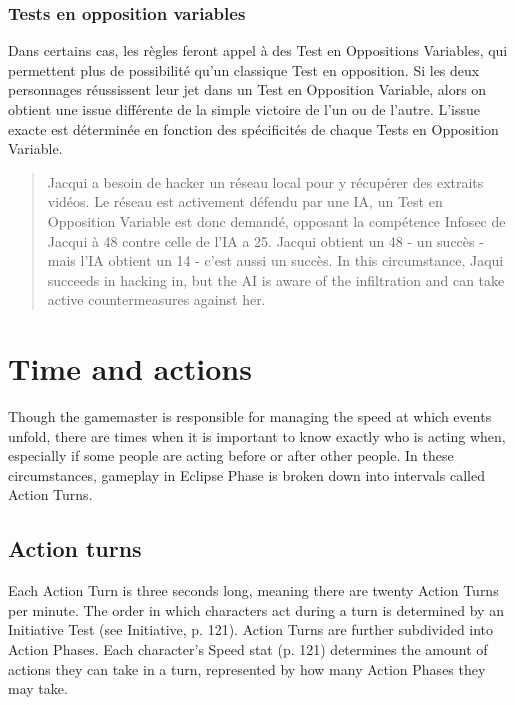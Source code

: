 \subsubsection{Tests en opposition variables} \label{sec:vari-oppos-test} 

Dans certains cas, les règles feront appel à des Test en Oppositions Variables, qui permettent plus de possibilité qu'un classique Test en opposition. Si les deux personnages réussissent leur jet dans un Test en Opposition Variable, alors on obtient une issue différente de la simple victoire de l'un ou de l'autre. L'issue exacte est déterminée en fonction des spécificités de chaque Tests en Opposition Variable. 

\begin{quotation} Jacqui a besoin de hacker un réseau local pour y récupérer des extraits vidéos. Le réseau est activement défendu par une IA, un Test en Opposition Variable est donc demandé, opposant la compétence Infosec de Jacqui à 48 contre celle de l'IA a 25. Jacqui obtient un 48 - un succès - mais l'IA obtient un 14 - c'est aussi un succès. In this circumstance, Jaqui succeeds in hacking in, but the AI is aware of the infiltration and can take active countermeasures against her. \end{quotation} 

\section{Time and actions} \label{sec:time-actions} 

Though the gamemaster is responsible for managing the speed at which events unfold, there are times when it is important to know exactly who is acting when, especially if some people are acting before or after other people. In these circumstances, gameplay in Eclipse Phase is broken down into intervals called Action Turns. 

\subsection{Action turns} \label{sec:action-turns} 

Each Action Turn is three seconds long, meaning there are twenty Action Turns per minute. The order in which characters act during a turn is determined by an Initiative Test (see Initiative, p. 121). Action Turns are further subdivided into Action Phases. Each character's Speed stat (p. 121) determines the amount of actions they can take in a turn, represented by how many Action Phases they may take. 

